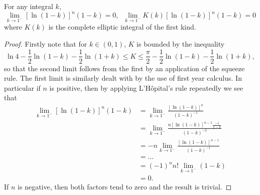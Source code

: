 \begin{lem}
For any integral $k$,
\[
\lim_{k\to 1^-} [\ln (1-k)]^n (1-k) = 0, \;\; \lim_{k\to 1^-} K(k)[\ln (1-k)]^n (1-k) = 0
\]
where $K(k)$ is the complete elliptic integral of the first kind.
\begin{proof}
Firstly note that for $k \in (0,1)$, $K$ is bounded by the inequality \[
\ln 4 - \frac{1}{2}\ln (1-k) - \frac{1}{2}\ln (1+k)
\leq
K
\leq
\frac{π}{2} - \frac{1}{2}\ln (1-k) - \frac{1}{2}\ln (1+k),
\]
so that the second limit follows from the first by an application of the squeeze rule. The first limit is similarly dealt with by the use of first year calculus. In particular if $n$ is positive, then by applying L'H\^opital's rule repeatedly we see that
\begin{align}
\lim_{k\to 1^-} [\ln (1-k)]^n (1-k)
&= \lim_{k\to 1^-} \frac{[\ln (1-k)]^n} {(1-k)^{-1}} \\
&= \lim_{k\to 1^-} \frac{n[\ln (1-k)]^{n-1}\frac{-1}{1-k}} {(1-k)^{-2}} \\
&= -n \lim_{k\to 1^-} \frac{[\ln (1-k)]^{n-1}} {(1-k)^{-1}} \\
&= \dots \\
&= (-1)^n n! \lim_{k\to 1^-} (1-k) \\
&= 0.
\end{align}
If $n$ is negative, then both factors tend to zero and the result is trivial.
\end{proof}
\end{lem}


